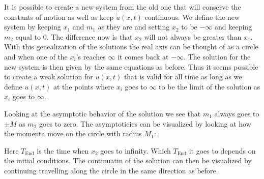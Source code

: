 \documentclass[english,master]{liumaiex}
\theoremstyle{plain}
\theoremstyle{definition}
\begin{document}
%
It is possible to create a new system from the old one that will conserve the constants of motion as well as keep $\dot{u}(x, t)$ continuous. We define the new system by keeping $x_1$ and $m_1$ as they are and setting $x_2$ to be $-\infty$ and keeping $m_2$ equal to $0$. The difference now is that $x_2$ will not always be greater than $x_1$. With this genealization of the solutions the real axis can be thought of as a circle and when one of the $x_i$'s reaches $\infty$ it comes back at $-\infty$. The solution for the new system is then given by the same equations as before. Thus it seems possible to create a weak solution for $u(x,t)$ that is valid for all time as long as we define $u(x, t)$ at the points where $x_i$ goes to $\infty$ to be the limit of the solution as $x_i$ goes to $\infty$.

Looking at the asymptotic behavior of the solution we see that $m_1$ always goes to $\pm M$ as $m_2$ goes to zero. The asymptoticics can be visualized by looking at how the momenta move on the circle with radius $M_1$:
\begin{center}
\end{center}
Here $T_{\text{End}}$ is the time when $x_2$ goes to infinity. Which $T_{\text{End}}$ it goes to depends on the initial conditions. The continuatin of the solution can then be visualized by continuing travelling along the circle in the same direction as before.
\end{document}
